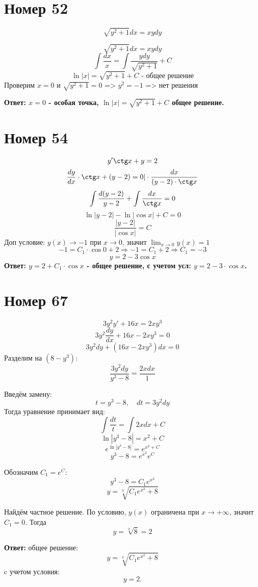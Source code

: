 \section*{Номер 52}
$$ \sqrt{y^2 + 1} dx = xy dy $$

\begin{solution}
    $$ \sqrt{y^2 + 1} dx = xy dy $$
    $$ \int \dfrac{dx}{x} = \int \dfrac{y dy}{\sqrt{y^2 + 1}} + C $$
    $$ \ln |x| = \sqrt{y^2 + 1} + C \text{ - общее решение} $$
    Проверим $x = 0$ и $\sqrt{y^2 + 1} = 0$ => $y^2 = -1$ => нет решения \par
    \textbf{Ответ: $x = 0$ - особая точка, $\ln |x| = \sqrt{y^2 + 1} + C$ общее решение.}

\end{solution}

\section*{Номер 54}

\begin{solution}
    $$ y' \ctg x + y = 2 $$
    $$ \dfrac{dy}{dx} \cdot \ctg x + (y - 2) = 0 | \cdot \dfrac{dx}{(y - 2) \cdot \ctg x}$$
    $$ \int \dfrac{d(y - 2)}{y - 2} + \int \dfrac{dx}{\ctg x} = 0 $$
    $$ \ln |y - 2| - \ln | \cos x | + C = 0 $$
    $$ \dfrac{|y - 2|}{|\cos x|} = C $$
    Доп условие: $y(x) \rightarrow -1$ при $x \rightarrow 0$, значит $\lim_{x \rightarrow 0} y(x) = 1$
    $$ -1 = C_1 \cdot \cos 0 + 2 \Rightarrow -1 = C_1 + 2 \Rightarrow C_1 = -3 $$
    $$ y = 2 - 3 \cos x $$
    \textbf{Ответ: $y = 2 + C_1 \cdot \cos x$ - общее решение, с учетом усл: $y = 2 - 3 \cdot \cos x$.}
\end{solution} \pagebreak

\section*{Номер 67} 

\begin{solution}
    $$ 3y^2 y' + 16x = 2xy^3 $$  
    $$ 3y^2 \dfrac{dy}{dx} + 16x - 2xy^3 = 0 $$  
    $$ 3y^2 dy + (16x - 2xy^3) dx = 0 $$  
    Разделим на $(8 - y^3)$:  
    $$ \dfrac{3y^2 dy}{y^3 - 8} = \dfrac{2x dx}{1} $$  

    Введём замену:  
    $$ t = y^3 - 8, \quad dt = 3y^2 dy $$  
    Тогда уравнение принимает вид:  
    $$ \int \dfrac{dt}{t} = \int 2x dx + C $$  
    $$ \ln |y^3 - 8| = x^2 + C $$  
    $$ e^{\ln |y^3 - 8|} = e^{x^2 + C} $$  
    $$ y^3 - 8 = e^{x^2} e^C $$  

    Обозначим $C_1 = e^C$:  
    $$ y^3 - 8 = C_1 e^{x^2} $$  
    $$ y = \sqrt[3]{C_1 e^{x^2} + 8} $$  

    Найдём частное решение.  
    По условию, $y(x)$ ограничена при $x \to +\infty$, значит $C_1 = 0$.  
    Тогда  
    $$ y = \sqrt[3]{8} = 2 $$  

    \textbf{Ответ:} общее решение:  
    $$ y = \sqrt[3]{C_1 e^{x^2} + 8} $$  
    c учетом условия:  
    $$ y = 2. $$
\end{solution}


\pagebreak